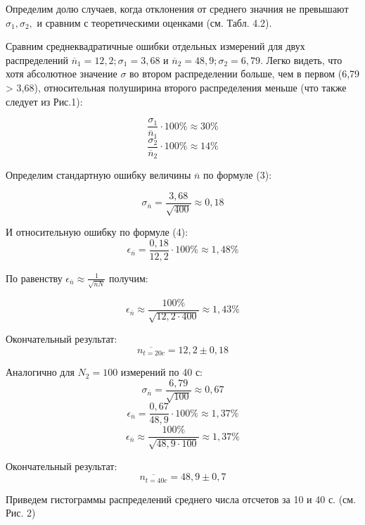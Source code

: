 Определим долю случаев, когда отклонения от среднего значния не превышают $\sigma_1, \sigma_2,$ и сравним с теоретическими оценками (см. Табл. 4.2).


Сравним среднеквадратичные ошибки отдельных измерений для двух распределений $\overline{n}_1 = 12,2; \sigma_1 = 3,68$ и $\overline{n}_2 = 48,9; \sigma_2 = 6,79$. Легко видеть, что хотя абсолютное значение $\sigma$ во втором распределении больше, чем в первом (6,79 > 3,68), относительная полуширина второго распределения меньше (что также следует из Рис.1):


\[\frac{\sigma_1}{\overline{n}_1}\cdot100\% \approx 30\% \]
\[\frac{\sigma_2}{\overline{n}_2}\cdot100\% \approx 14\% \]




Определим стандартную ошибку величины $\overline{n}$ по формуле (3):


\[\sigma_{\overline{n}} = \frac{3,68}{\sqrt{400}} \approx 0,18\]


И относительную ошибку по формуле (4):
\[\epsilon_{\overline{n}} = \frac{0,18}{12,2}\cdot100\% \approx 1,48\%\]


По равенству $\epsilon_{\overline{n}} \approx \frac{1}{\sqrt{\overline{n}N}}$ получим:


\[\epsilon_{\overline{n}} \approx \frac{100\%}{\sqrt{12,2\cdot400}} \approx 1,43\%\]


Окончательный результат: 
\[\overline{n_{t=20c}} = 12,2 \pm 0,18\]


Аналогично для $N_2 = 100$ измерений по 40 с:
\[\sigma_{\overline{n}} = \frac{6,79}{\sqrt{100}} \approx 0,67\]
\[\epsilon_{\overline{n}} = \frac{0,67}{48,9}\cdot100\% \approx 1,37\%\]
\[\epsilon_{\overline{n}} \approx \frac{100\%}{\sqrt{48,9\cdot100}} \approx 1,37\%\]


Окончательный результат: 
\[\overline{n_{t=40c}} = 48,9 \pm 0,7\]




Приведем гистограммы распределений среднего числа отсчетов за 10 и 40 с. (см. Рис. 2)


